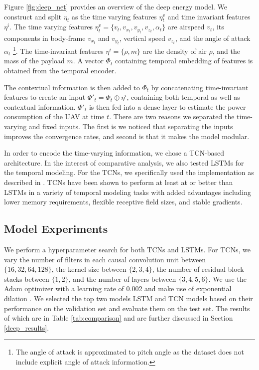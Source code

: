\documentclass[letterpaper, 10 pt, conference]{ieeeconf}
\begin{document}
Figure \ref{fig:deep_net} provides an overview of the deep energy model. We construct and split $\eta_t$  as the time varying features $\eta^v_t$ and time invariant features $ \eta^i $.  
The time varying features $ \eta^v_t = \{ v_t , v_{x_t}, v_{y_t}, v_{z_t}, \alpha_t \} $ are airspeed $v_t$, its components in body-frame $v_{x_t}$ and $v_{y_t}$, vertical speed $v_{z_t}$, and the angle of attack $\alpha_t$ \footnote{The angle of attack is approximated to pitch angle as the dataset does not include explicit angle of attack information.}. The time-invariant features $ \eta^i = \{ \rho, m \}$ are the density of air $\rho$, and the mass of the payload $m$.
A vector $\Phi_t$ containing temporal embedding of features is obtained from the temporal encoder.

The contextual information is then added to $\Phi_t$ by concatenating time-invariant features to create an input $\Phi'_t = \Phi_t \oplus \eta^i $, containing both temporal as well as contextual information.  $\Phi'_t$ is then fed into a dense layer to estimate the power consumption of the UAV at time $t$. There are two reasons we separated the time-varying and fixed inputs. The first is we noticed that separating the inputs improves the convergence rates, and second is that it makes the model modular.

In order to encode the time-varying information, we chose a TCN-based \cite{oord2016pixel} architecture. In the interest of comparative analysis, we also tested LSTMs \cite{hochreiter1997long} for the temporal modeling. 
For the TCNs, we specifically used the implementation as described in \cite{bai2018empirical}. TCNs have been shown to perform at least at or better than LSTMs in a variety of temporal modeling tasks with added advantages including lower memory requirements, flexible receptive field sizes, and stable gradients. 






\subsection{Model Experiments}




We perform a hyperparameter search for both TCNs and LSTMs. For TCNs, we vary the number of filters in each causal convolution unit between $\{16, 32, 64, 128\}$, the kernel size between $\{2, 3, 4\}$, the number of residual block stacks between $\{1, 2\}$, and the number of layers between $\{3, 4, 5, 6\}$. We use the Adam optimizer with a learning rate of 0.002 and make use of exponential dilation \cite{bai2018empirical}. We selected the top two models LSTM and TCN models based on their performance on the validation set and evaluate them on the test set. The results of which are in Table \ref{tab:comparison} and are further discussed in Section \ref{deep_results}.
\end{document}
